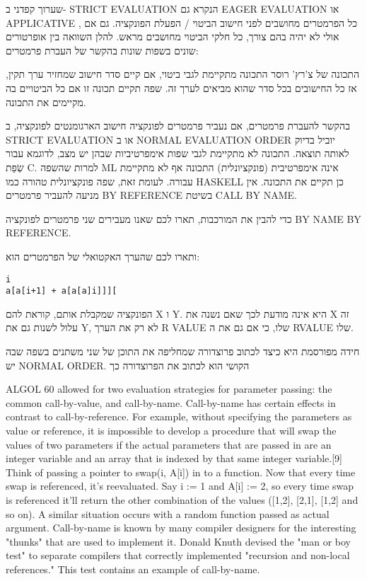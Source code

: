         שערוך קפדני
        ב- STRICT EVALUATION הנקרא גם EAGER EVALUATION או APPLICATIVE , כל הפרמטרים מחושבים לפני חישוב הביטוי / הפעלת הפונקציה. גם אם אולי לא יהיה בהם צורך, כל חלקי הביטוי מחושבים מראש.
        להלן השוואה בין אופרטורים שונים בשפות שונות בהקשר של העברת פרמטרים:

        התכונה של צ'רץ' רוסר
        התכונה מתקיימת לגבי ביטוי, אם קיים סדר חישוב שמחזיר ערך תקין, אז כל החישובים
        בכל סדר שהוא מביאים לערך זה. שפה תקיים תכונה זו אם כל הביטויים בה מקיימים את
        התכונה.

        בהקשר להעברת פרמטרים, אם נעביר פרמטרים לפונקציה חישוב הארגומנטים לפונקציה, ב
        STRICT EVALUATION או ב NORMAL EVALUATION ORDER יוביל בדיוק לאותה תוצאה. התכונה
        לא מתקיימת לגבי שפות אימפרטיביות שבהן יש מצב, לדוגמא עבור שְׂפַת C. למרות שהשפה
        ML אינה אימפרטיבית (פונקציונלית) התכונה אף לא מתקיימת עבורה. לעומת זאת, שפה
        פונקציונלית טהורה כמו HASKELL כן תקיים את התכונה. אין מניעה להעביר פרמטרים BY
        REFERENCE בשיטת CALL BY NAME.

        כדי להבין את המורכבות, תארו לכם שאנו מעבירים שני פרמטרים לפונקציה BY NAME BY
        REFERENCE.

        ותארו לכם שהערך האקטואלי של הפרמטרים הוא:

\begin{verbatim}
i
a[a[i+1] + a[a[a]i]]][
\end{verbatim}

        הפונקציה שמקבלת אותם, קוראת להם X ו Y. היא אינה מודעת לכך שאם נשנה את X זה עלול לשנות גם את Y, לא רק את הערך R VALUE שלו, כי אם גם את ה RVALUE שלו.

        חידה מפורסמת היא כיצד לכתוב פרוצדורה שמחליפה את התוכן של שני משתנים בשפה שבה יש NORMAL ORDER. הקושי הוא לכתוב את הפרוצדורה כך

        ALGOL 60 allowed for two evaluation strategies for parameter passing: the common call-by-value, and call-by-name. Call-by-name has certain effects in contrast to call-by-reference. For example, without specifying the parameters as value or reference, it is impossible to develop a procedure that will swap the values of two parameters if the actual parameters that are passed in are an integer variable and an array that is indexed by that same integer variable.[9] Think of passing a pointer to swap(i, A[i]) in to a function. Now that every time swap is referenced, it's reevaluated. Say i := 1 and A[i] := 2, so every time swap is referenced it'll return the other combination of the values ([1,2], [2,1], [1,2] and so on). A similar situation occurs with a random function passed as actual argument.
        Call-by-name is known by many compiler designers for the interesting "thunks" that are used to implement it. Donald Knuth devised the "man or boy test" to separate compilers that correctly implemented "recursion and non-local references." This test contains an example of call-by-name.

